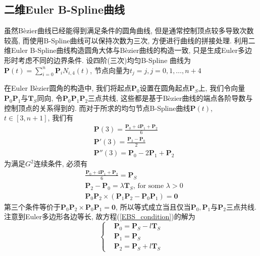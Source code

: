 \documentclass[utf8]{ctexart} %
\begin{document}
	 \subsection{二维Euler B-Spline曲线}
	 虽然B\`ezier曲线已经能得到满足条件的圆角曲线, 但是通常控制顶点较多导致次数较高, 而使用B-Spline曲线可以保持次数为三次, 方便进行曲线的拼接处理. 利用二维Euler B-Spline曲线构造圆角大体与B\`{e}zier曲线的构造一致, 只是生成Euler多边形时考虑不同的边界条件.  设四阶(三次)均匀B-Spline 曲线为$\boldsymbol{P}(t)=\sum_{i=0}^n\boldsymbol{P}_iN_{i,4}(t)$, 节点向量为$t_j = j,j=0,1,\dots,n+4$ \par 
	 在Euler B\`{e}zier圆角的构造中, 我们将起点$\boldsymbol{P}_0$设置在圆角起点$\boldsymbol{P}_S$上, 我们令向量$\boldsymbol{P}_0\boldsymbol{P}_1$与$\boldsymbol{T}_S$同向, 令$\boldsymbol{P}_0$$\boldsymbol{P}_1$$\boldsymbol{P}_2$三点共线, 这些都是基于B\`{e}zier曲线的端点各阶导数与控制顶点的关系得到的. 而对于所求的均匀节点B-Spline曲线$\boldsymbol{P}(t)$, $t\in[3,n+1]$, 我们有
	 \begin{equation}
	 \begin{aligned}
	 &\boldsymbol{P}(3)=\frac{\boldsymbol{P}_0+4\boldsymbol{P}_1+\boldsymbol{P}_2}6\\
	 &\boldsymbol{P}'(3)=\frac{\boldsymbol{P}_2-\boldsymbol{P}_0}2\\
	 &\boldsymbol{P}''(3)=\boldsymbol{P}_0-2\boldsymbol{P}_1+\boldsymbol{P}_2
	 \end{aligned}
	 \end{equation}
	 为满足$G^2$连续条件, 必须有
	 \begin{equation}\label{EBS_condition}
	 \begin{aligned}
	 &\frac{\boldsymbol{P}_0+4\boldsymbol{P}_1+\boldsymbol{P}_2}6=\boldsymbol{P}_S\\
	 &\boldsymbol{P}_2-\boldsymbol{P}_0=\lambda\boldsymbol{T}_S\text{, for some }\lambda>0\\
	 &\boldsymbol{P}_0\boldsymbol{P}_2\times(\boldsymbol{P}_1\boldsymbol{P}_2-\boldsymbol{P}_0\boldsymbol{P}_1)=\boldsymbol{0}
	 \end{aligned}
	 \end{equation}
	 第三个条件等价于$\boldsymbol{P}_0\boldsymbol{P}_2\times\boldsymbol{P}_0\boldsymbol{P}_1=\boldsymbol{0}$, 所以等式成立当且仅当$\boldsymbol{P}_0,\boldsymbol{P}_1$与$\boldsymbol{P}_2$三点共线. 注意到Euler多边形各边等长,  故方程(\ref{EBS_condition})的解为
	 \begin{equation}\label{Solution}
	 \left\{
	 \begin{aligned}
	 &\boldsymbol{P}_0 = \boldsymbol{P}_S-l\boldsymbol{T}_S\\
	 &\boldsymbol{P}_1 = \boldsymbol{P}_S\\
	 &\boldsymbol{P}_2 = \boldsymbol{P}_S+l\boldsymbol{T}_S
	 \end{aligned}
	 \right.
	 \end{equation}
\end{document}
